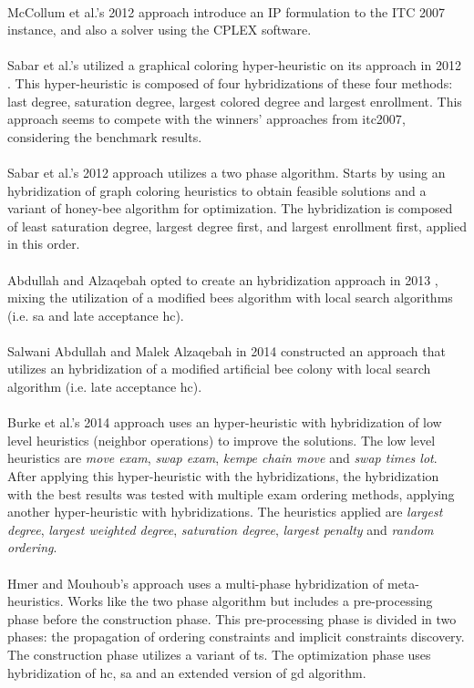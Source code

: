 \\
McCollum et al.'s 2012 approach \cite{McCollum2012} introduce an IP formulation to the ITC 2007 instance, and also a solver using the CPLEX software.\\
\\
Sabar et al.'s utilized a graphical coloring hyper-heuristic on its approach in 2012 \cite{Sabar2012}. This hyper-heuristic is composed of four hybridizations of these four methods: last degree, saturation degree, largest colored degree and largest enrollment. This approach seems to compete with the winners' approaches from \gls{itc2007}, considering the benchmark results.\\
\\
Sabar et al.'s 2012 approach \cite{Sabar2012a} utilizes a two phase algorithm. Starts by using an hybridization of graph coloring heuristics to obtain feasible solutions and a variant of honey-bee algorithm for optimization. The hybridization is composed of least saturation degree, largest degree first, and largest enrollment first, applied in this order.\\
\\
Abdullah and Alzaqebah opted to create an hybridization approach in 2013 \cite{Abdullah2013}, mixing the utilization of a modified bees algorithm with local search algorithms (i.e. \gls{sa} and late acceptance \gls{hc}).\\
\\
Salwani Abdullah and Malek Alzaqebah in 2014 constructed an approach \cite{Alzaqebah2014} that utilizes an hybridization of a modified artificial bee colony with local search algorithm (i.e. late acceptance \gls{hc}).\\
\\
Burke et al.'s 2014 approach \cite{Burke2014} uses an hyper-heuristic with hybridization of low level heuristics (neighbor operations) to improve the solutions. The low level heuristics are \textit{move exam}, \textit{swap exam}, \textit{kempe chain move} and \textit{swap times lot}. After applying this hyper-heuristic with the hybridizations, the hybridization with the best results was tested with multiple exam ordering methods, applying another hyper-heuristic with hybridizations. The heuristics applied are \textit{largest degree}, \textit{largest weighted degree}, \textit{saturation degree}, \textit{largest penalty} and \textit{random ordering}.\\
\\
Hmer and Mouhoub's approach \cite{Mouhoub2014} uses a multi-phase hybridization of meta-heuristics. Works like the two phase algorithm but includes a pre-processing phase before the construction phase. This pre-processing phase is divided in two phases: the propagation of ordering constraints and implicit constraints discovery. The construction phase utilizes a variant of \gls{ts}. The optimization phase uses hybridization of \gls{hc}, \gls{sa} and an extended version of \gls{gd} algorithm.\\
